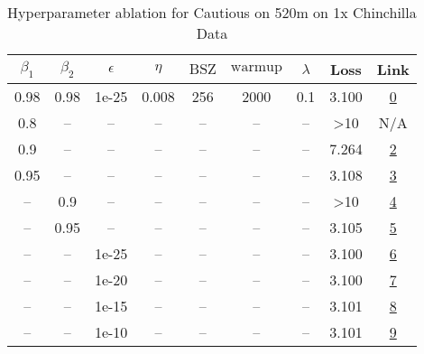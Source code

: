 \begin{table}[H]
\centering
\caption{Hyperparameter ablation for Cautious on 520m on 1x Chinchilla Data}
\label{tab:ablation_cautious_520m_1}
\begin{tabular}{ccccccccc}
\toprule
$\beta_1$ & $\beta_2$ & $\epsilon$ & $\eta$ & $\mathrm{BSZ}$ & $\mathrm{warmup}$ & $\lambda$ & Loss & Link \\
\midrule
0.98 & 0.98 & 1e-25 & 0.008 & 256 & 2000 & 0.1 & 3.100 & \href{https://wandb.ai/stanford-mercury/optimizer-scaling/runs/sweep-520m-10B-cautiouscda486lr0.008-wd0.1-minlr0-warmup2000-b10-1d8924}{0} \\
\midrule
0.8 & -- & -- & -- & -- & -- & -- & >10 & N/A \\
0.9 & -- & -- & -- & -- & -- & -- & 7.264 & \href{https://wandb.ai/stanford-mercury/optimizer-scaling/runs/sweep-520m-10B-cautiousfe5526lr0.008-wd0.1-minlr0-warmup2000-b10-a0ea38}{2} \\
0.95 & -- & -- & -- & -- & -- & -- & 3.108 & \href{https://wandb.ai/stanford-mercury/optimizer-scaling/runs/sweep-520m-10B-cautiousb9bea7lr0.008-wd0.1-minlr0-warmup2000-b10-4e055f}{3} \\
-- & 0.9 & -- & -- & -- & -- & -- & >10 & \href{https://wandb.ai/stanford-mercury/optimizer-scaling/runs/sweep-520m-10B-cautiousfa5ab7lr0.008-wd0.1-minlr0-warmup2000-b10-fc260f}{4} \\
-- & 0.95 & -- & -- & -- & -- & -- & 3.105 & \href{https://wandb.ai/stanford-mercury/optimizer-scaling/runs/sweep-520m-10B-cautious06f834lr0.008-wd0.1-minlr0-warmup2000-b10-e18beb}{5} \\
-- & -- & 1e-25 & -- & -- & -- & -- & 3.100 & \href{https://wandb.ai/stanford-mercury/optimizer-scaling/runs/sweep-520m-10B-cautiouscda486lr0.008-wd0.1-minlr0-warmup2000-b10-1d8924}{6} \\
-- & -- & 1e-20 & -- & -- & -- & -- & 3.100 & \href{https://wandb.ai/stanford-mercury/optimizer-scaling/runs/sweep-520m-10B-cautious635735lr0.008-wd0.1-minlr0-warmup2000-b10-d30ff8}{7} \\
-- & -- & 1e-15 & -- & -- & -- & -- & 3.101 & \href{https://wandb.ai/stanford-mercury/optimizer-scaling/runs/sweep-520m-10B-cautiousfba4cdlr0.008-wd0.1-minlr0-warmup2000-b10-bfcfff}{8} \\
-- & -- & 1e-10 & -- & -- & -- & -- & 3.101 & \href{https://wandb.ai/stanford-mercury/optimizer-scaling/runs/sweep-520m-10B-cautiouse8c98clr0.008-wd0.1-minlr0-warmup2000-b10-205bf1}{9} \\

\end{tabular}
\end{table}
